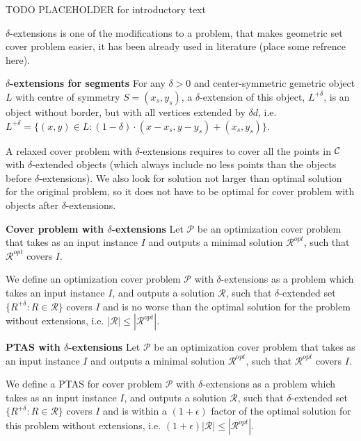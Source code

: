 TODO PLACEHOLDER for introductory text

$\delta$-extensions is one of the
modifications to a problem, that makes geometric set cover problem easier,
it has been already used in literature (place some refrence here).

\begin{defi}\textbf{$\delta$-extensions for segments}
For any $\delta > 0$ and center-symmetric gemetric object $L$ with
centre of symmetry $S = (x_s, y_s)$,
a $\delta$-extension of this object, $L^{+\delta}$,
is an object without border, but with all vertices extended by $\delta d$,
i.e. $ L^{+\delta} =
\{ (x, y) \in L : (1 - \delta)\cdot(x - x_s, y - y_s) + (x_s, y_s)\}$.
\end{defi}


A relaxed cover problem with $\delta$-extensions
requires to cover all the points in $\mathcal{C}$
with $\delta$-extended objects (which always 
include no less points than the objects
before $\delta$-extensions). 
We also look for solution not larger than
optimal solution for the original problem,
so it does not have to be optimal for cover problem with 
objects after $\delta$-extensions.


\begin{defi}\textbf{Cover problem with $\delta$-extensions}
Let $\mathcal{P}$ be an optimization cover problem 
that takes as an input instance $I$
and outputs a minimal solution $\mathcal{R}^{opt}$, such that
$\mathcal{R}^{opt}$ covers $I$.

We define an optimization cover problem $\mathcal{P}$
with $\delta$-extensions as a problem which
takes an input instance $I$,
and outputs a solution $\mathcal{R}$, such that $\delta$-extended set
$\{ R^{+\delta} :  R \in \mathcal{R} \}$ covers $I$
and is no worse than the optimal solution for the problem without
extensions, i.e. $|\mathcal{R}| \le |\mathcal{R}^{opt}|$.
\end{defi}


\begin{defi}\textbf{PTAS with $\delta$-extensions}
Let $\mathcal{P}$ be an optimization cover problem 
that takes as an input instance $I$
and outputs a minimal solution $\mathcal{R}^{opt}$, such that
$\mathcal{R}^{opt}$ covers $I$.


We define a PTAS for cover problem $\mathcal{P}$
with $\delta$-extensions as a problem which
takes as an input instance $I$,
and outputs a solution $\mathcal{R}$, such that $\delta$-extended set
$\{ R^{+\delta} :  R \in \mathcal{R} \}$ covers $I$
and is within a $(1+\epsilon)$ factor of the optimal
solution for this problem without
extensions, i.e. $(1+\epsilon)|\mathcal{R}| \le |\mathcal{R}^{opt}|$.

\end{defi}
